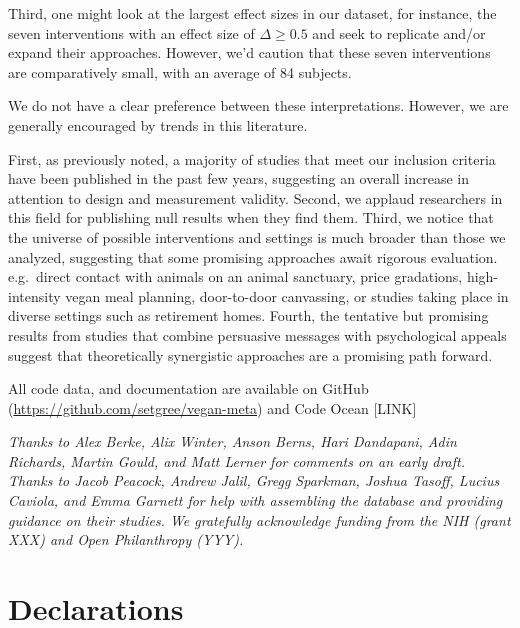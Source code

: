\documentclass[sn-nature,pdflatex]{sn-jnl}
\begin{document}
Third, one might look at the largest effect sizes in our dataset, for
instance, the seven interventions with an effect size of
\(\Delta \geq 0.5\)
\citep{bianchi2022, carfora2023, merrill2009, piester2020} and seek to
replicate and/or expand their approaches. However, we'd caution that
these seven interventions are comparatively small, with an average of 84
subjects.

We do not have a clear preference between these interpretations.
However, we are generally encouraged by trends in this literature.

First, as previously noted, a majority of studies that meet our
inclusion criteria have been published in the past few years, suggesting
an overall increase in attention to design and measurement validity.
Second, we applaud researchers in this field for publishing null results
when they find them. Third, we notice that the universe of possible
interventions and settings is much broader than those we analyzed,
suggesting that some promising approaches await rigorous evaluation.
e.g.~direct contact with animals on an animal sanctuary, price
gradations, high-intensity vegan meal planning, door-to-door canvassing,
or studies taking place in diverse settings such as retirement homes.
Fourth, the tentative but promising results from studies that combine
persuasive messages with psychological appeals suggest that
theoretically synergistic approaches are a promising path forward.

\backmatter


All code data, and documentation are available on GitHub
(\url{https://github.com/setgree/vegan-meta}) and Code Ocean {[}LINK{]}


\emph{Thanks to Alex Berke, Alix Winter, Anson Berns, Hari Dandapani,
Adin Richards, Martin Gould, and Matt Lerner for comments on an early
draft. Thanks to Jacob Peacock, Andrew Jalil, Gregg Sparkman, Joshua
Tasoff, Lucius Caviola, and Emma Garnett for help with assembling the
database and providing guidance on their studies. We gratefully
acknowledge funding from the NIH (grant XXX) and Open Philanthropy
(YYY).}

\section*{Declarations}\label{declarations}
\end{document}
